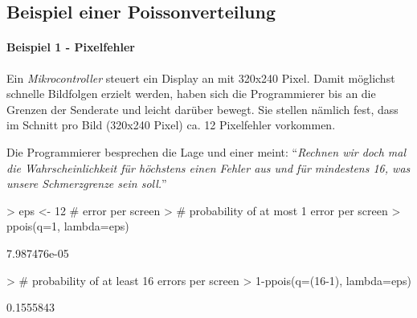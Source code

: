 \clearpage

\subsection{Beispiel einer Poissonverteilung}

\paragraph{Beispiel 1 - Pixelfehler}
Ein \emph{Mikrocontroller} steuert ein Display an mit 320x240 Pixel.
Damit möglichst schnelle Bildfolgen erzielt werden, haben sich die
Programmierer bis an die Grenzen der Senderate und leicht darüber 
bewegt. Sie stellen nämlich fest, dass im Schnitt pro Bild 
(320x240 Pixel) ca. 12 Pixelfehler vorkommen.

Die Programmierer besprechen die Lage und einer meint: 
"`\emph{Rechnen wir doch mal die Wahrscheinlichkeit für höchstens 
einen Fehler aus und für mindestens 16, was unsere Schmerzgrenze 
sein soll.}"'

\begin{Schunk}
\begin{Sinput}
> eps <- 12 # error per screen
> # probability of at most 1 error per screen
> ppois(q=1, lambda=eps)
\end{Sinput}
\begin{Soutput}
[1] 7.987476e-05
\end{Soutput}
\begin{Sinput}
> # probability of at least 16 errors per screen
> 1-ppois(q=(16-1), lambda=eps)
\end{Sinput}
\begin{Soutput}
[1] 0.1555843
\end{Soutput}
\end{Schunk}



